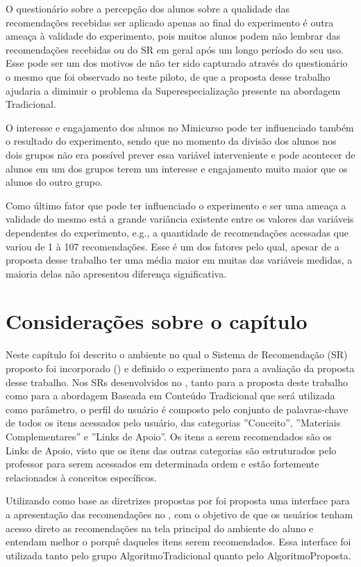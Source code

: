 O questionário sobre a percepção dos alunos sobre a qualidade das recomendações recebidas ser aplicado apenas ao final
do experimento é outra ameaça à validade do experimento, pois muitos alunos podem não lembrar das recomendações recebidas
ou do SR em geral após um longo período do seu uso. Esse pode ser um dos motivos de não ter sido capturado através do
questionário o mesmo que foi observado no teste piloto, de que a proposta desse trabalho ajudaria a diminuir o
problema da Superespecialização presente na abordagem Tradicional.

O interesse e engajamento dos alunos no Minicurso pode ter influenciado também o resultado do experimento, sendo que no momento
da divisão dos alunos nos dois grupos não era possível prever essa variável interveniente e pode acontecer de alunos em
um dos grupos terem um interesse e engajamento muito maior que os alunos do outro grupo.

Como último fator que pode ter influenciado o experimento e ser uma ameaça a validade do mesmo está a grande variância
existente entre os valores das variáveis dependentes do experimento, e.g., a quantidade de recomendações acessadas que variou
de 1 à 107 recomendações. Esse é um dos fatores pelo qual, apesar de a proposta desse trabalho ter uma média maior em
muitas das variáveis medidas, a maioria delas não apresentou diferença significativa.

\section{Considerações sobre o capítulo}

Neste capítulo foi descrito o ambiente no qual o Sistema de Recomendação (SR) proposto foi incorporado (\adaptweb) e definido o
experimento para a avaliação da proposta desse trabalho. Nos SRs desenvolvidos no \adaptweb, tanto para a proposta
deste trabalho como para a abordagem Baseada em Conteúdo Tradicional que será utilizada como parâmetro, o perfil do
usuário é composto pelo conjunto de palavras-chave de todos os itens acessados pelo usuário, das
categorias ''Conceito'', ''Materiais Complementares'' e ''Links de Apoio''. Os itens a serem recomendados são os
Links de Apoio, visto que os itens das outras categorias são estruturados pelo professor para serem acessados em determinada
ordem e estão fortemente relacionados à conceitos específicos.

Utilizando como base as diretrizes propostas por  foi proposta uma interface para a
apresentação das recomendações no \adaptweb, com o objetivo de que os usuários tenham acesso direto as recomendações na
tela principal do ambiente do aluno e entendam melhor o porquê daqueles itens serem recomendados. Essa interface foi
utilizada tanto pelo grupo AlgoritmoTradicional quanto pelo AlgoritmoProposta.

